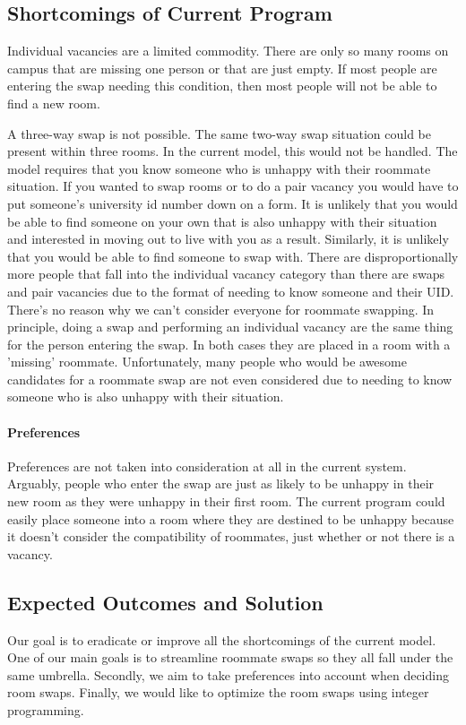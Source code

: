 \documentclass[12pt]{article}
\begin{document}
\begin{multicols}{2}
\subsection{Shortcomings of Current Program}
Individual vacancies are a limited commodity. There are only so many rooms on campus that are missing one person or that are just empty. If most people are entering the swap needing this condition, then most people will not be able to find a new room. 

A three-way swap is not possible. The same two-way swap situation could be present within three rooms. In the current model, this would not be handled.
The model requires that you know someone who is unhappy with their roommate situation. If you wanted to swap rooms or to do a pair vacancy you would have to put someone’s university id number down on a form. It is unlikely that you would be able to find someone on your own that is also unhappy with their situation and interested in moving out to live with you as a result. Similarly, it is unlikely that you would be able to find someone to swap with. There are disproportionally more people that fall into the individual vacancy category than there are swaps and pair vacancies due to the format of needing to know someone and their UID. \\

There's no reason why we can't consider everyone for roommate swapping. In principle, doing a swap and performing an individual vacancy are the same thing for the person entering the swap. In both cases they are placed in a room with a 'missing' roommate. Unfortunately, many people who would be awesome candidates for a roommate swap are not even considered due to needing to know someone who is also unhappy with their situation.
\paragraph{Preferences}
Preferences are not taken into consideration at all in the current system. Arguably, people who enter the swap are just as likely to be unhappy in their new room as they were unhappy in their first room. The current program could easily place someone into a room where they are destined to be unhappy because it doesn't consider the compatibility of roommates, just whether or not there is a vacancy. 

\subsection{Expected Outcomes and Solution}
Our goal is to eradicate or improve all the shortcomings of the current model. One of our main goals is to streamline roommate swaps so they all fall under the same umbrella. Secondly, we aim to take preferences into account when deciding room swaps. Finally, we would like to optimize the room swaps using integer programming.


\end{multicols}
\end{document}
